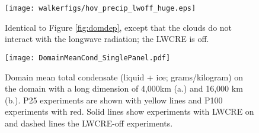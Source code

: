 \documentclass[draft]{agujournal2019}
\begin{document}
{\begin{figure}
    \texttt{[image: walkerfigs/hov\_precip\_lwoff\_huge.eps]}
  \caption{Identical to Figure \ref{fig:domdep}, except that the clouds do not interact with the longwave radiation; the LWCRE is off.}
  \label{fig:domdep_lwoff}
\end{figure}

\begin{figure}
  \centering
       \texttt{[image: DomainMeanCond\_SinglePanel.pdf]}
          \caption{Domain mean total condensate (liquid + ice; grams/kilogram) on the domain with a long dimension of 4,000km (a.)
          and 16,000 km (b.).  P25 experiments are shown with yellow lines and P100 experiments with red.  Solid lines show 
          experiments with LWCRE on and dashed lines the LWCRE-off experiments.}
  \label{fig:TotCond_P25P100}
\end{figure}



}
\end{document}
